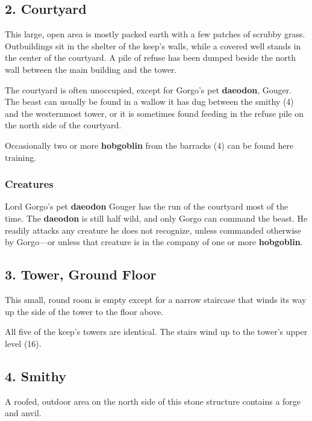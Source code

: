\documentclass[10pt,a4paper,twoside,bg=print,twocolumn,openany,nodeprecatedcode]{dndbook}
\begin{document}
\subsection{2. Courtyard}
\begin{DndReadAloud}{}
This large, open area is mostly packed earth with a few patches of scrubby grass. Outbuildings sit in the shelter of the keep's walls, while a covered well stands in the center of the courtyard. A pile of refuse has been dumped beside the north wall between the main building and the tower.

\end{DndReadAloud}

The courtyard is often unoccupied, except for Gorgo's pet \textbf{daeodon}, Gouger. The beast can usually be found in a wallow it has dug between the smithy (4) and the westernmost tower, or it is sometimes found feeding in the refuse pile on the north side of the courtyard.

Occasionally two or more \textbf{hobgoblin} from the barracks (4) can be found here training.

\subsubsection{Creatures}
Lord Gorgo's pet \textbf{daeodon} Gouger has the run of the courtyard most of the time. The \textbf{daeodon} is still half wild, and only Gorgo can command the beast. He readily attacks any creature he does not recognize, unless commanded otherwise by Gorgo—or unless that creature is in the company of one or more \textbf{hobgoblin}.

\subsection{3. Tower, Ground Floor}
\begin{DndReadAloud}{}
This small, round room is empty except for a narrow staircase that winds its way up the side of the tower to the floor above.

\end{DndReadAloud}

All five of the keep's towers are identical. The stairs wind up to the tower's upper level (16).

\subsection{4. Smithy}
\begin{DndReadAloud}{}
A roofed, outdoor area on the north side of this stone structure contains a forge and anvil.

\end{DndReadAloud}
\end{document}
